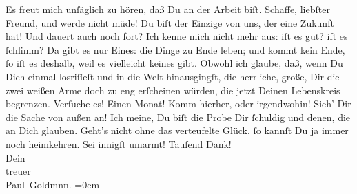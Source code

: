 \begin{ledgroupsized}[t]{13cm}
           \pstart
           Es freut mich unſäglich zu hören, daß Du an der Arbeit biſt. Schaffe, liebſter
               Freund, und werde nicht {\pb}müde! Du biſt der Einzige von
               uns, der eine Zukunft hat!\pend
           \pstart
           Und \label{K_L02699-5v}\label{K_L02699-5h} dauert auch noch fort? Ich kenne mich nicht mehr aus: iſt
               es gut? iſt es ſchlimm? Da gibt es nur Eines: die Dinge zu Ende leben; und  kommt kein Ende, ſo iſt es deshalb, weil es
               vielleicht keines gibt. Obwohl ich glaube, daß, wenn Du Dich einmal losriſſeſt und in
               die Welt hinausgingſt, die herrliche, große, Dir die zwei weißen Arme doch zu eng
               erſcheinen würden, die jetzt Deinen {\pb}Lebenskreis
               begrenzen. Verſuche es! Einen Monat! Komm hierher, oder irgendwohin! Sieh’ Dir die
               Sache von außen an! Ich meine, Du biſt die Probe Dir ſchuldig und denen, die an Dich
               glauben. Geht’s nicht \strikeout{\textcolor{gray}{×}} ohne das verteufelte Glück, ſo kannſt Du ja immer noch heimkehren.\pend
           \pstart
           Sei innigſt umarmt! Tauſend Dank! {\\[\baselineskip]}Dein{\\[\baselineskip]}treuer{\\[\baselineskip]}\spacefill\mbox{Paul Goldmnn.}\pend
           \leftskip=0em{}\endnumbering{}\end{ledgroupsized}\begin{anhang}\end{anhang}\newcommand{\dateiname}{L02699}\newcommand{\titel}{Paul Goldmann an Arthur Schnitzler, 27. 6. [1892]}\newcommand{\editorInnen}{Martin Anton Müller und Laura Untner}
      